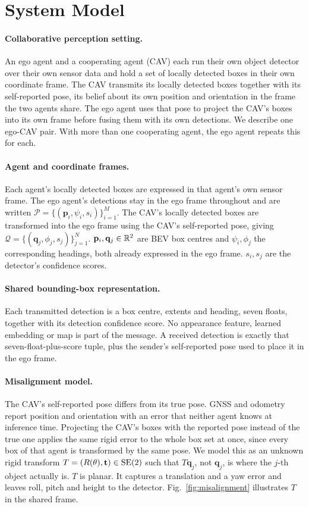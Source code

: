 \section{System Model}
\label{sec:system}

\paragraph{Collaborative perception setting.}
An ego agent and a cooperating agent (CAV) each run their own object detector over their own sensor data and hold a set of locally detected boxes in their own coordinate frame. The CAV transmits its locally detected boxes together with its self-reported pose, its belief about its own position and orientation in the frame the two agents share. The ego agent uses that pose to project the CAV's boxes into its own frame before fusing them with its own detections. We describe one ego-CAV pair. With more than one cooperating agent, the ego agent repeats this for each.

\paragraph{Agent and coordinate frames.}
Each agent's locally detected boxes are expressed in that agent's own sensor frame. The ego agent's detections stay in the ego frame throughout and are written $\mathcal{P}=\{(\mathbf{p}_i,\psi_i,s_i)\}_{i=1}^{M}$. The CAV's locally detected boxes are transformed into the ego frame using the CAV's self-reported pose, giving $\mathcal{Q}=\{(\mathbf{q}_j,\phi_j,s_j)\}_{j=1}^{N}$. $\mathbf{p}_i,\mathbf{q}_j\in\mathbb{R}^2$ are BEV box centres and $\psi_i,\phi_j$ the corresponding headings, both already expressed in the ego frame. $s_i,s_j$ are the detector's confidence scores.

\paragraph{Shared bounding-box representation.}
Each transmitted detection is a box centre, extents and heading, seven floats, together with its detection confidence score. No appearance feature, learned embedding or map is part of the message. A received detection is exactly that seven-float-plus-score tuple, plus the sender's self-reported pose used to place it in the ego frame.

\paragraph{Misalignment model.}
The CAV's self-reported pose differs from its true pose. GNSS and odometry report position and orientation with an error that neither agent knows at inference time. Projecting the CAV's boxes with the reported pose instead of the true one applies the same rigid error to the whole box set at once, since every box of that agent is transformed by the same pose. We model this as an unknown rigid transform $T=(R(\theta),\mathbf{t})\in\mathrm{SE}(2)$ such that $T\mathbf{q}_j$, not $\mathbf{q}_j$, is where the $j$-th object actually is. $T$ is planar. It captures a translation and a yaw error and leaves roll, pitch and height to the detector. Fig.~\ref{fig:misalignment} illustrates $T$ in the shared frame.

